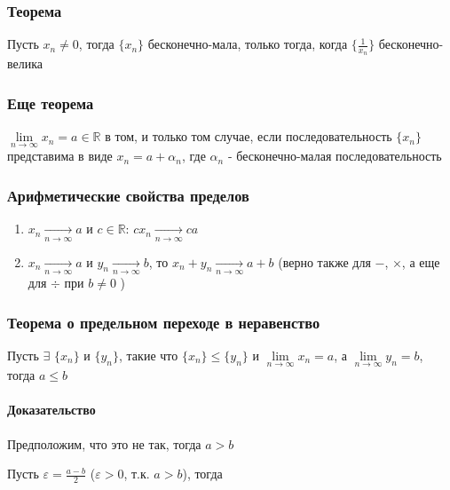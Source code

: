 \documentclass[class=article,a4paper,12pt,crop=false]{standalone}
\begin{document}
\subsubsection{Теорема}

Пусть $x_n \neq 0$, тогда $\{x_n\}$ бесконечно-мала, только тогда, когда $\{\frac{1}{x_n}\}$ бесконечно-велика

\subsubsection{Еще теорема}

$\lim\limits_{n \rightarrow \infty}{x_n} = a \in \mathbb{R}$ в том, и только том случае, если последовательность
$\{x_n\}$ представима в виде $x_n = a + \alpha_n$, где $\alpha_n$ - бесконечно-малая последовательность

\subsubsection{Арифметические свойства пределов}

\begin{enumerate}
  \item {
    $x_n \underset{n \rightarrow \infty}{\rightarrow} a$ и $c \in \mathbb{R}$:
    $cx_n \underset{n \rightarrow \infty}{\rightarrow} ca$
  }
  \item {
    $x_n \underset{n \rightarrow \infty}{\rightarrow} a$ и $y_n \underset{n \rightarrow \infty}{\rightarrow} b$, то
    $x_n + y_n \underset{n \rightarrow \infty}{\rightarrow} a + b$ (верно также для $-$, $\times$, а еще для
    $\div$ при $b \neq 0$ )
  }
\end{enumerate}

\subsubsection{Теорема о предельном переходе в неравенство}

Пусть $\exists$ $\{x_n\}$ и $\{y_n\}$, такие что $\{x_n\} \leq \{y_n\}$ и $\lim\limits_{n \rightarrow \infty}x_n = a$,
а $\lim\limits_{n \rightarrow \infty}y_n = b$, тогда $a \leq b$

\paragraph{Доказательство} Предположим, что это не так, тогда $a > b$

Пусть $\varepsilon = \frac{a - b}{2}$ ($\varepsilon > 0$, т.к. $a > b$), тогда
\end{document}

